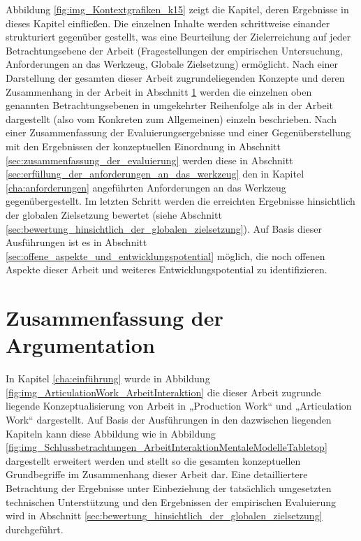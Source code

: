 Abbildung \ref{fig:img_Kontextgrafiken_k15} zeigt die Kapitel, deren Ergebnisse in dieses Kapitel einfließen. Die einzelnen Inhalte werden schrittweise einander strukturiert gegenüber gestellt, was eine Beurteilung der Zielerreichung auf jeder Betrachtungsebene der Arbeit (Fragestellungen der empirischen Untersuchung, Anforderungen an das Werkzeug, Globale Zielsetzung) ermöglicht. Nach einer Darstellung der gesamten dieser Arbeit zugrundeliegenden Konzepte und deren Zusammenhang in der Arbeit in Abschnitt \ref{sec:überblick_über_den_gesamtzusammenhang} werden die einzelnen oben genannten Betrachtungsebenen in umgekehrter Reihenfolge als in der Arbeit dargestellt (also vom Konkreten zum Allgemeinen) einzeln beschrieben. Nach einer Zusammenfassung der Evaluierungsergebnisse und einer Gegenüberstellung mit den Ergebnissen der konzeptuellen Einordnung in Abschnitt \ref{sec:zusammenfassung_der_evaluierung} werden diese in Abschnitt \ref{sec:erfüllung_der_anforderungen_an_das_werkzeug} den in Kapitel \ref{cha:anforderungen} angeführten Anforderungen an das Werkzeug gegenübergestellt. Im letzten Schritt werden die erreichten Ergebnisse hinsichtlich der globalen Zielsetzung bewertet (siehe Abschnitt \ref{sec:bewertung_hinsichtlich_der_globalen_zielsetzung}). Auf Basis dieser Ausführungen ist es in Abschnitt \ref{sec:offene_aspekte_und_entwicklungspotential} möglich, die noch offenen Aspekte dieser Arbeit und weiteres Entwicklungspotential zu identifizieren.

\section{Zusammenfassung der Argumentation} %
\label{sec:überblick_über_den_gesamtzusammenhang}

In Kapitel \ref{cha:einführung} wurde in Abbildung \ref{fig:img_ArticulationWork_ArbeitInteraktion} die dieser Arbeit zugrunde liegende Konzeptualisierung von Arbeit in „Production Work“ und „Articulation Work“ dargestellt. Auf Basis der Ausführungen in den dazwischen liegenden Kapiteln kann diese Abbildung wie in Abbildung \ref{fig:img_Schlussbetrachtungen_ArbeitInteraktionMentaleModelleTabletop} dargestellt erweitert werden und stellt so die gesamten konzeptuellen Grundbegriffe im Zusammenhang dieser Arbeit dar. Eine detailliertere Betrachtung der Ergebnisse unter Einbeziehung der tatsächlich umgesetzten technischen Unterstützung und den Ergebnissen der empirischen Evaluierung wird in Abschnitt \ref{sec:bewertung_hinsichtlich_der_globalen_zielsetzung} durchgeführt.

